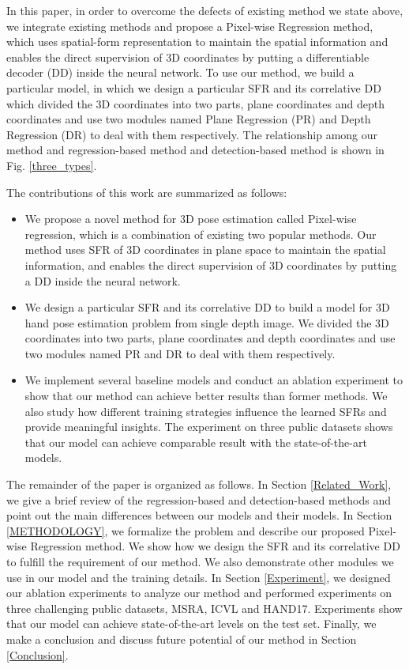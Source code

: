 \documentclass[journal]{IEEEtran}
\begin{document}
In this paper, in order to overcome the defects of existing method we state above, 
we integrate existing methods and propose a Pixel-wise Regression method, 
which uses spatial-form representation to maintain the spatial information and 
enables the direct supervision of 3D coordinates by putting a differentiable decoder (DD) inside the neural network. 
To use our method, we build a particular model, 
in which we design a particular SFR and its correlative DD which divided the 3D coordinates into two parts, 
plane coordinates and depth coordinates and use two modules named Plane Regression (PR) and Depth Regression (DR) to deal with them respectively. 
The relationship among our method and regression-based method and detection-based method is shown in Fig\@. \ref{three_types}. 



The contributions of this work are summarized as follows:  

\begin{itemize}
  \item We propose a novel method for 3D pose estimation called Pixel-wise regression, 
  which is a combination of existing two popular methods. 
  Our method uses SFR of 3D coordinates in plane space to maintain the spatial information, 
  and enables the direct supervision of 3D coordinates by putting a DD inside the neural network.
  \item We design a particular SFR and its correlative DD to 
  build a model for 3D hand pose estimation problem from single depth image. 
  We divided the 3D coordinates into two parts, 
  plane coordinates and depth coordinates and use two modules named PR and DR to deal with them respectively.
  \item We implement several baseline models and conduct an ablation experiment to 
  show that our method can achieve better results than former methods. 
  We also study how different training strategies influence the learned SFRs and provide meaningful insights. 
  The experiment on three public datasets shows that our model can achieve comparable result with the state-of-the-art models.
\end{itemize}

The remainder of the paper is organized as follows. 
In Section \ref{Related_Work}, we give a brief review of the regression-based and detection-based methods and 
point out the main differences between our models and their models. 
In Section \ref{METHODOLOGY}, we formalize the problem and describe our proposed Pixel-wise Regression method. 
We show how we design the SFR and its correlative DD to fulfill the requirement of our method. 
We also demonstrate other modules we use in our model and the training details. 
In Section \ref{Experiment}, we designed our ablation experiments to analyze our method and performed experiments 
on three challenging public datasets, MSRA, ICVL and HAND17. 
Experiments show that our model can achieve state-of-the-art levels on the test set. 
Finally, we make a conclusion and discuss future potential of our method in Section \ref{Conclusion}.
\end{document}
